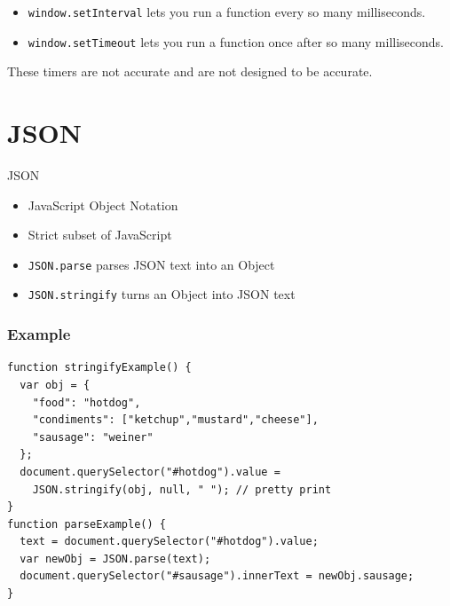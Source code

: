 \documentclass[../CMPUT-404-Notes.tex]{subfiles}
\begin{document}
\begin{itemize}
    \item \texttt{window.setInterval} lets you run a function every so many milliseconds.
    \item \texttt{window.setTimeout} lets you run a function once after so many milliseconds.
\end{itemize}

\begin{Note}
    These timers are not accurate and are not designed to be accurate.
\end{Note}

\section{JSON}
\begin{DndSidebar}[color=PhbLightGreen]{JSON}
    \begin{itemize}
        \item JavaScript Object Notation
        \item Strict subset of JavaScript
        \item \texttt{JSON.parse} parses JSON text into an Object
        \item \texttt{JSON.stringify} turns an Object into JSON text
    \end{itemize} 

\end{DndSidebar}

\subsubsection{Example}
\begin{verbatim}
function stringifyExample() {
  var obj = { 
    "food": "hotdog",
    "condiments": ["ketchup","mustard","cheese"],
    "sausage": "weiner"
  };
  document.querySelector("#hotdog").value = 
    JSON.stringify(obj, null, " "); // pretty print
}
function parseExample() {
  text = document.querySelector("#hotdog").value;
  var newObj = JSON.parse(text); 
  document.querySelector("#sausage").innerText = newObj.sausage;
}
\end{verbatim}
\end{document}
